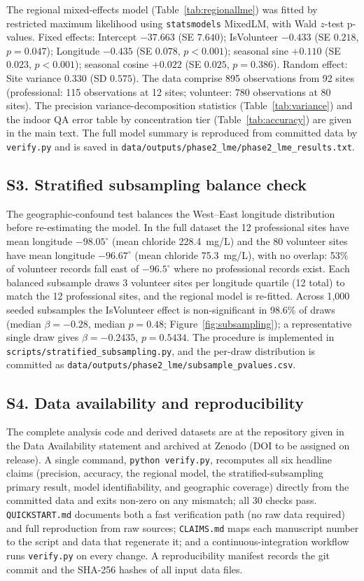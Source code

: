 \documentclass[lineno]{wlpeerj}
\begin{document}
The regional mixed-effects model (Table~\ref{tab:regionallme}) was fitted by restricted maximum likelihood using \texttt{statsmodels} MixedLM, with Wald $z$-test p-values. Fixed effects: Intercept $-37.663$ (SE $7.640$); IsVolunteer $-0.433$ (SE $0.218$, $p = 0.047$); Longitude $-0.435$ (SE $0.078$, $p < 0.001$); seasonal sine $+0.110$ (SE $0.023$, $p < 0.001$); seasonal cosine $+0.022$ (SE $0.025$, $p = 0.386$). Random effect: Site variance $0.330$ (SD $0.575$). The data comprise 895 observations from 92 sites (professional: 115 observations at 12 sites; volunteer: 780 observations at 80 sites). The precision variance-decomposition statistics (Table~\ref{tab:variance}) and the indoor QA error table by concentration tier (Table~\ref{tab:accuracy}) are given in the main text. The full model summary is reproduced from committed data by \texttt{verify.py} and is saved in \texttt{data/outputs/phase2\_lme/phase2\_lme\_results.txt}.

\subsection*{S3. Stratified subsampling balance check}

The geographic-confound test balances the West--East longitude distribution before re-estimating the model. In the full dataset the 12 professional sites have mean longitude $-98.05^{\circ}$ (mean chloride 228.4~mg/L) and the 80 volunteer sites have mean longitude $-96.67^{\circ}$ (mean chloride 75.3~mg/L), with no overlap: 53\% of volunteer records fall east of $-96.5^{\circ}$ where no professional records exist. Each balanced subsample draws 3 volunteer sites per longitude quartile (12 total) to match the 12 professional sites, and the regional model is re-fitted. Across 1{,}000 seeded subsamples the IsVolunteer effect is non-significant in 98.6\% of draws (median $\beta = -0.28$, median $p = 0.48$; Figure~\ref{fig:subsampling}); a representative single draw gives $\beta = -0.2435$, $p = 0.5434$. The procedure is implemented in \texttt{scripts/stratified\_subsampling.py}, and the per-draw distribution is committed as \texttt{data/outputs/phase2\_lme/subsample\_pvalues.csv}.

\subsection*{S4. Data availability and reproducibility}

The complete analysis code and derived datasets are at the repository given in the Data Availability statement and archived at Zenodo (DOI to be assigned on release). A single command, \texttt{python verify.py}, recomputes all six headline claims (precision, accuracy, the regional model, the stratified-subsampling primary result, model identifiability, and geographic coverage) directly from the committed data and exits non-zero on any mismatch; all 30 checks pass. \texttt{QUICKSTART.md} documents both a fast verification path (no raw data required) and full reproduction from raw sources; \texttt{CLAIMS.md} maps each manuscript number to the script and data that regenerate it; and a continuous-integration workflow runs \texttt{verify.py} on every change. A reproducibility manifest records the git commit and the SHA-256 hashes of all input data files.
\end{document}
